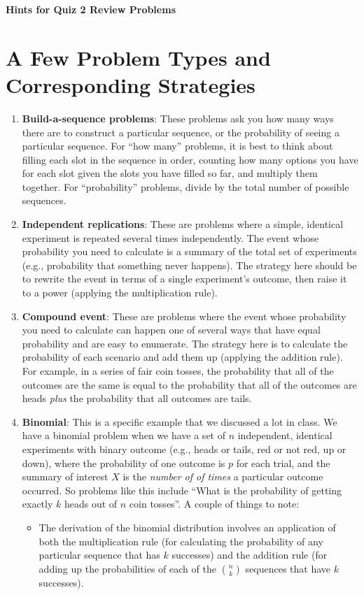 \documentclass[11pt]{article}
\begin{document}
\centerline{\textbf{Hints for Quiz 2 Review Problems}}

\section*{A Few Problem Types and Corresponding Strategies}
\begin{enumerate}
\item {\bf Build-a-sequence problems}: These problems ask you how many ways there are to construct a particular sequence, or the probability of seeing a particular sequence. For ``how many'' problems, it is best to think about filling each slot in the sequence in order, counting how many options you have for each slot given the slots you have filled so far, and multiply them together. For ``probability'' problems, divide by the total number of possible sequences.
\item {\bf Independent replications}: These are problems where a simple, identical experiment is repeated several times independently. The event whose probability you need to calculate is a summary of the total set of experiments (e.g., probability that something never happens). The strategy here should be to rewrite the event in terms of a single experiment's outcome, then raise it to a power (applying the multiplication rule).
\item {\bf Compound event}: These are problems where the event whose probability you need to calculate can happen one of several ways that have equal probability and are easy to enumerate. The strategy here is to calculate the probability of each scenario and add them up (applying the addition rule). For example, in a series of fair coin tosses, the probability that all of the outcomes are the same is equal to the probability that all of the outcomes are heads \emph{plus} the probability that all outcomes are tails.
\item {\bf Binomial}: This is a specific example that we discussed a lot in class. We have a binomial problem when we have a set of $n$ independent, identical experiments with binary outcome (e.g., heads or tails, red or not red, up or down), where the probability of one outcome is $p$ for each trial, and the summary of interest $X$ is the \emph{number of of times} a particular outcome occurred. So problems like this include ``What is the probability of getting exactly $k$ heads out of $n$ coin tosses''. A couple of things to note:
    \begin{itemize}
    \item The derivation of the binomial distribution involves an application of both the multiplication rule (for calculating the probability of any particular sequence that has $k$ successes) and the addition rule (for adding up the probabilities of each of the ${n \choose k}$ sequences that have $k$ successes).

\end{itemize}
\end{enumerate}
\end{document}

